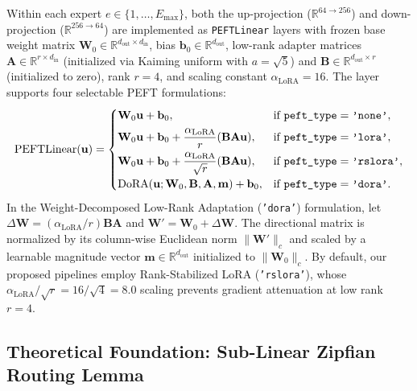 \documentclass{interact}
\begin{document}
Within each expert $e \in \{1, \dots, E_{\max}\}$, both the up-projection ($\mathbb{R}^{64 \to 256}$) and down-projection ($\mathbb{R}^{256 \to 64}$) are implemented as \texttt{PEFTLinear} layers with frozen base weight matrix $\mathbf{W}_0 \in \mathbb{R}^{d_{\text{out}} \times d_{\text{in}}}$, bias $\mathbf{b}_0 \in \mathbb{R}^{d_{\text{out}}}$, low-rank adapter matrices $\mathbf{A} \in \mathbb{R}^{r \times d_{\text{in}}}$ (initialized via Kaiming uniform with $a = \sqrt{5}$) and $\mathbf{B} \in \mathbb{R}^{d_{\text{out}} \times r}$ (initialized to zero), rank $r = 4$, and scaling constant $\alpha_{\text{LoRA}} = 16$. The layer supports four selectable PEFT formulations:
\begin{equation}
    \operatorname{PEFTLinear}(\mathbf{u}) = \begin{cases}
        \mathbf{W}_0 \mathbf{u} + \mathbf{b}_0,                                                                           & \text{if } \texttt{peft\_type} = \text{\texttt{'none'}},   \\[4pt]
        \mathbf{W}_0 \mathbf{u} + \mathbf{b}_0 + \dfrac{\alpha_{\text{LoRA}}}{r} (\mathbf{B}\mathbf{A}\mathbf{u}),        & \text{if } \texttt{peft\_type} = \text{\texttt{'lora'}},   \\[6pt]
        \mathbf{W}_0 \mathbf{u} + \mathbf{b}_0 + \dfrac{\alpha_{\text{LoRA}}}{\sqrt{r}} (\mathbf{B}\mathbf{A}\mathbf{u}), & \text{if } \texttt{peft\_type} = \text{\texttt{'rslora'}}, \\[6pt]
        \operatorname{DoRA}(\mathbf{u}; \mathbf{W}_0, \mathbf{B}, \mathbf{A}, \mathbf{m}) + \mathbf{b}_0,                 & \text{if } \texttt{peft\_type} = \text{\texttt{'dora'}}.
    \end{cases}
    \label{eq:peft_variants}
\end{equation}
In the Weight-Decomposed Low-Rank Adaptation (\texttt{'dora'}) formulation, let $\Delta\mathbf{W} = (\alpha_{\text{LoRA}}/r)\mathbf{B}\mathbf{A}$ and $\mathbf{W}' = \mathbf{W}_0 + \Delta\mathbf{W}$. The directional matrix is normalized by its column-wise Euclidean norm $\|\mathbf{W}'\|_c$ and scaled by a learnable magnitude vector $\mathbf{m} \in \mathbb{R}^{d_{\text{out}}}$ initialized to $\|\mathbf{W}_0\|_c$. By default, our proposed pipelines employ Rank-Stabilized LoRA (\texttt{'rslora'}), whose $\alpha_{\text{LoRA}}/\sqrt{r} = 16/\sqrt{4} = 8.0$ scaling prevents gradient attenuation at low rank $r=4$.

\subsection{Theoretical Foundation: Sub-Linear Zipfian Routing Lemma}
\label{subsec:routing_lemma}
\end{document}
